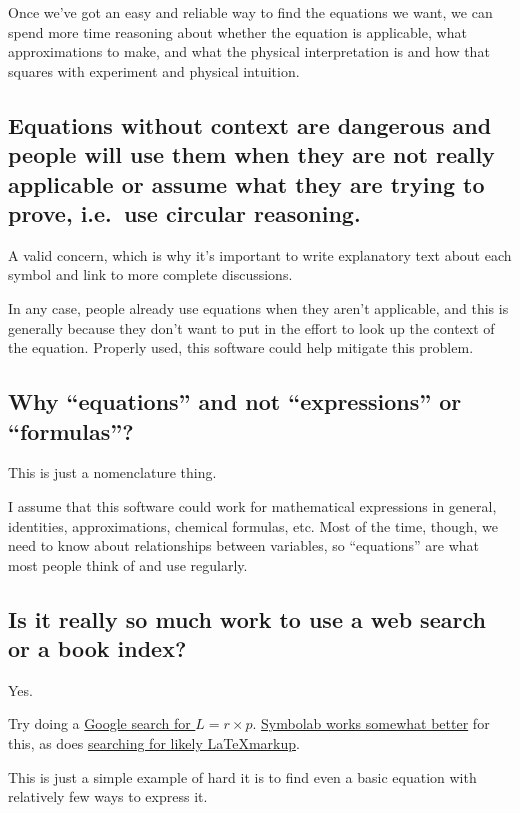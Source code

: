 \documentclass[12pt,letterpaper]{article}
\begin{document}
Once we've got an easy and reliable way to find the equations we want, we can spend more time reasoning about whether the equation is applicable, what approximations to make, and what the physical interpretation is and how that squares with experiment and physical intuition.

\subsection{Equations without context are dangerous and people will use them when they are not really applicable or assume what they are trying to prove, i.e.\ use circular reasoning.}

A valid concern, which is why it's important to write explanatory text about each symbol and link to more complete discussions.

In any case, people already use equations when they aren't applicable, and this is generally because they don't want to put in the effort to look up the context of the equation. Properly used, this software could help mitigate this problem.

\subsection{Why ``equations'' and not ``expressions'' or ``formulas''?}

This is just a nomenclature thing.

I assume that this software could work for mathematical expressions in general, identities, approximations, chemical formulas, etc. Most of the time, though, we need to know about relationships between variables, so ``equations'' are what most people think of and use regularly.

\subsection{Is it really so much work to use a web search or a book index?}

Yes.

Try doing a \href{https://www.google.com/search?q=%22L+%3D+r+%C3%97+P%22&oq=%22L+%3D+r+%C3%97+P%22}{Google search for $L = r \times p$}. \href{http://symbolab.com/search?origin=suggestion&query=L%3Dr%5Ctimes%20p}{Symbolab works somewhat better} for this, as does \href{https://www.google.com/search?&q=%
}{searching for likely \LaTeX markup}.

This is just a simple example of hard it is to find even a basic equation with relatively few ways to express it.
\end{document}
